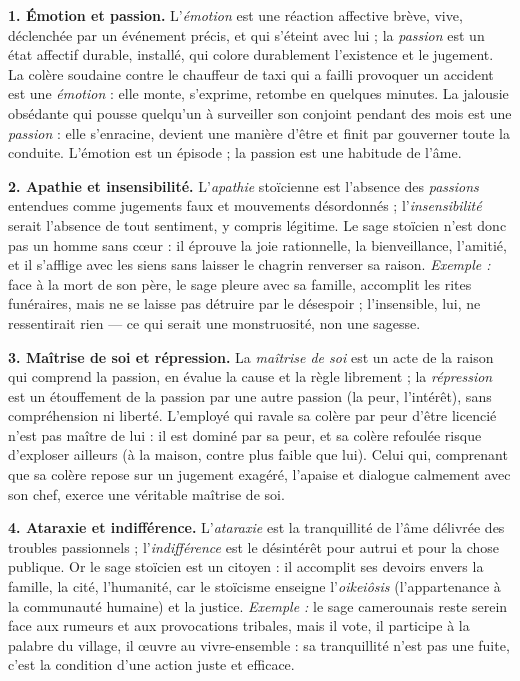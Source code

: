 \documentclass[11pt]{article}
\begin{document}
\begin{corrige}

\textbf{1. Émotion et passion.} L'\emph{émotion} est une réaction affective brève, vive, déclenchée par un événement précis, et qui s'éteint avec lui ; la \emph{passion} est un état affectif durable, installé, qui colore durablement l'existence et le jugement. La colère soudaine contre le chauffeur de taxi qui a failli provoquer un accident est une \emph{émotion} : elle monte, s'exprime, retombe en quelques minutes. La jalousie obsédante qui pousse quelqu'un à surveiller son conjoint pendant des mois est une \emph{passion} : elle s'enracine, devient une manière d'être et finit par gouverner toute la conduite. L'émotion est un épisode ; la passion est une habitude de l'âme.

\textbf{2. Apathie et insensibilité.} L'\emph{apathie} stoïcienne est l'absence des \emph{passions} entendues comme jugements faux et mouvements désordonnés ; l'\emph{insensibilité} serait l'absence de tout sentiment, y compris légitime. Le sage stoïcien n'est donc pas un homme sans cœur : il éprouve la joie rationnelle, la bienveillance, l'amitié, et il s'afflige avec les siens sans laisser le chagrin renverser sa raison. \emph{Exemple :} face à la mort de son père, le sage pleure avec sa famille, accomplit les rites funéraires, mais ne se laisse pas détruire par le désespoir ; l'insensible, lui, ne ressentirait rien — ce qui serait une monstruosité, non une sagesse.

\textbf{3. Maîtrise de soi et répression.} La \emph{maîtrise de soi} est un acte de la raison qui comprend la passion, en évalue la cause et la règle librement ; la \emph{répression} est un étouffement de la passion par une autre passion (la peur, l'intérêt), sans compréhension ni liberté. L'employé qui ravale sa colère par peur d'être licencié n'est pas maître de lui : il est dominé par sa peur, et sa colère refoulée risque d'exploser ailleurs (à la maison, contre plus faible que lui). Celui qui, comprenant que sa colère repose sur un jugement exagéré, l'apaise et dialogue calmement avec son chef, exerce une véritable maîtrise de soi.

\textbf{4. Ataraxie et indifférence.} L'\emph{ataraxie} est la tranquillité de l'âme délivrée des troubles passionnels ; l'\emph{indifférence} est le désintérêt pour autrui et pour la chose publique. Or le sage stoïcien est un citoyen : il accomplit ses devoirs envers la famille, la cité, l'humanité, car le stoïcisme enseigne l'\emph{oikeiôsis} (l'appartenance à la communauté humaine) et la justice. \emph{Exemple :} le sage camerounais reste serein face aux rumeurs et aux provocations tribales, mais il vote, il participe à la palabre du village, il œuvre au vivre-ensemble : sa tranquillité n'est pas une fuite, c'est la condition d'une action juste et efficace.

\end{corrige}
\end{document}
